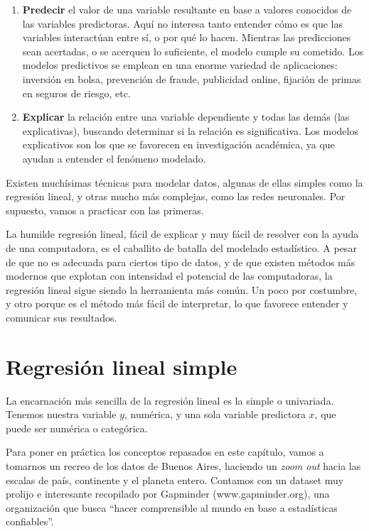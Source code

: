 \documentclass[]{book}
\begin{document}
\begin{enumerate}
\def\labelenumi{\arabic{enumi}.}
\item
  \textbf{Predecir} el valor de una variable resultante en base a
  valores conocidos de las variables predictoras. Aquí no interesa tanto
  entender cómo es que las variables interactúan entre sí, o por qué lo
  hacen. Mientras las predicciones sean acertadas, o se acerquen lo
  suficiente, el modelo cumple su cometido. Los modelos predictivos se
  emplean en una enorme variedad de aplicaciones: inversión en bolsa,
  prevención de fraude, publicidad online, fijación de primas en seguros
  de riesgo, etc.
\item
  \textbf{Explicar} la relación entre una variable dependiente y todas
  las demás (las explicativas), buscando determinar si la relación es
  significativa. Los modelos explicativos son los que se favorecen en
  investigación académica, ya que ayudan a entender el fenómeno
  modelado.
\end{enumerate}

Existen muchísimas técnicas para modelar datos, algunas de ellas simples
como la regresión lineal, y otras mucho más complejas, como las redes
neuronales. Por supuesto, vamos a practicar con las primeras.

La humilde regresión lineal, fácil de explicar y muy fácil de resolver
con la ayuda de una computadora, es el caballito de batalla del modelado
estadístico. A pesar de que no es adecuada para ciertos tipo de datos, y
de que existen métodos más modernos que explotan con intensidad el
potencial de las computadoras, la regresión lineal sigue siendo la
herramienta más común. Un poco por costumbre, y otro porque es el método
más fácil de interpretar, lo que favorece entender y comunicar sus
resultados.

\section{Regresión lineal simple}\label{regresion-lineal-simple}

La encarnación más sencilla de la regresión lineal es la simple o
univariada. Tenemos nuestra variable \(y\), numérica, y una sola
variable predictora \(x\), que puede ser numérica o categórica.

Para poner en práctica los conceptos repasados en este capítulo, vamos a
tomarnos un recreo de los datos de Buenos Aires, haciendo un \emph{zoom
out} hacia las escalas de país, continente y el planeta entero. Contamos
con un dataset muy prolijo e interesante recopilado por Gapminder
(www.gapminder.org), una organización que busca ``hacer comprensible al
mundo en base a estadísticas confiables''.
\end{document}
